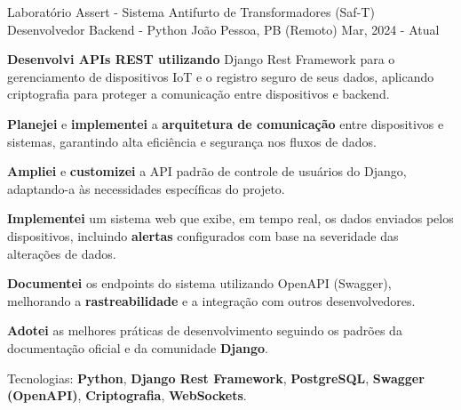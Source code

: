 
\begin{cventries}
  \cventry
  {Laboratório Assert - Sistema Antifurto de Transformadores (Saf-T)} %
  {Desenvolvedor Backend - Python} %
  {João Pessoa, PB (Remoto)} %
  {Mar, 2024 - Atual} %
  {
    \begin{cvitems}
      \item {\textbf{Desenvolvi APIs REST utilizando} {Django Rest Framework} para o gerenciamento de dispositivos  {IoT} e o registro seguro de seus dados, aplicando  {criptografia} para proteger a comunicação entre dispositivos e backend.}
      \item {\textbf{Planejei} e \textbf{implementei} a \textbf{arquitetura de comunicação} entre dispositivos e sistemas, garantindo alta eficiência e segurança nos fluxos de dados.}
      \item {\textbf{Ampliei} e \textbf{customizei} a API padrão de controle de usuários do {Django}, adaptando-a às necessidades específicas do projeto.}
      \item {\textbf{Implementei} um sistema web que exibe, em tempo real, os dados enviados pelos dispositivos, incluindo \textbf{alertas} configurados com base na severidade das alterações de dados.}
      \item {\textbf{Documentei} os endpoints do sistema utilizando  {OpenAPI (Swagger)}, melhorando a \textbf{rastreabilidade} e a integração com outros desenvolvedores.}
      \item {\textbf{Adotei} as melhores práticas de desenvolvimento seguindo os padrões da documentação oficial e da comunidade \textbf{Django}.}
      \item {Tecnologias: \textbf{Python}, \textbf{Django Rest Framework}, \textbf{PostgreSQL}, \textbf{Swagger (OpenAPI)}, \textbf{Criptografia}, \textbf{WebSockets}.}
    \end{cvitems}
  }


\end{cventries}
